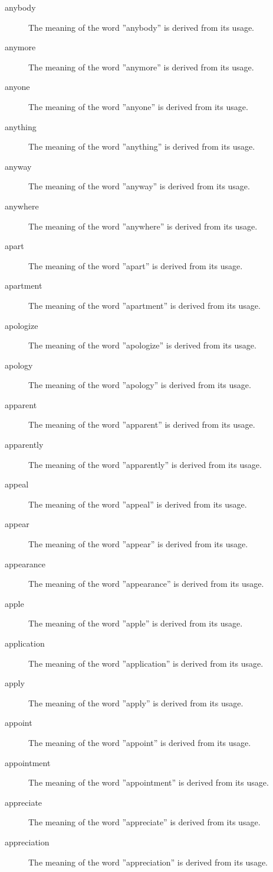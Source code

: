 \documentclass[12pt, letterpaper]{memoir}
\begin{document}
\begin{description}
\item[anybody] The meaning of the word ''anybody'' is derived from its usage.
\item[anymore] The meaning of the word ''anymore'' is derived from its usage.
\item[anyone] The meaning of the word ''anyone'' is derived from its usage.
\item[anything] The meaning of the word ''anything'' is derived from its usage.
\item[anyway] The meaning of the word ''anyway'' is derived from its usage.
\item[anywhere] The meaning of the word ''anywhere'' is derived from its usage.
\item[apart] The meaning of the word ''apart'' is derived from its usage.
\item[apartment] The meaning of the word ''apartment'' is derived from its usage.
\item[apologize] The meaning of the word ''apologize'' is derived from its usage.
\item[apology] The meaning of the word ''apology'' is derived from its usage.
\item[apparent] The meaning of the word ''apparent'' is derived from its usage.
\item[apparently] The meaning of the word ''apparently'' is derived from its usage.
\item[appeal] The meaning of the word ''appeal'' is derived from its usage.
\item[appear] The meaning of the word ''appear'' is derived from its usage.
\item[appearance] The meaning of the word ''appearance'' is derived from its usage.
\item[apple] The meaning of the word ''apple'' is derived from its usage.
\item[application] The meaning of the word ''application'' is derived from its usage.
\item[apply] The meaning of the word ''apply'' is derived from its usage.
\item[appoint] The meaning of the word ''appoint'' is derived from its usage.
\item[appointment] The meaning of the word ''appointment'' is derived from its usage.
\item[appreciate] The meaning of the word ''appreciate'' is derived from its usage.
\item[appreciation] The meaning of the word ''appreciation'' is derived from its usage.

\end{description}
\end{document}
